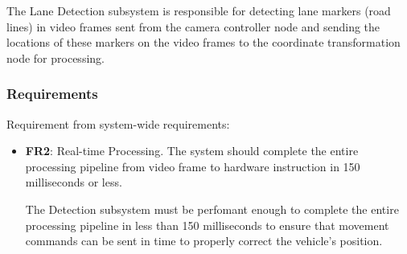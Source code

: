 \documentclass[titlepage, draft]{article}
\begin{document}
The Lane Detection subsystem is responsible for detecting lane markers (road lines) in video frames sent from the camera
controller node and sending the locations of these markers on the video frames to the coordinate transformation node for
processing.

\subsubsection{Requirements}

Requirement from system-wide requirements:

\begin{itemize}
	\item \textbf{FR2}: Real-time Processing. The system should complete the entire processing pipeline from video frame to hardware instruction in 150 milliseconds or less.

	The Detection subsystem must be perfomant enough to complete the entire processing pipeline in less than 150 milliseconds to ensure that movement commands can be sent in time to properly correct the vehicle's position.
\end{itemize}
\end{document}
